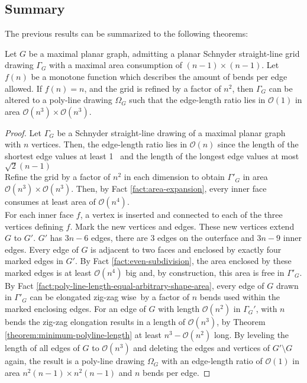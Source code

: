 \subsection{Summary}
The previous results can be summarized to the following theorems:
\begin{theorem}\label{theorem:max-planar-ratio1}
\end{theorem}
Let $G$ be a maximal planar graph, admitting a planar Schnyder straight-line grid drawing $\Gamma_G$ with a maximal area consumption of $(n-1)\times(n-1)$. Let $f(n)$ be a monotone function which describes the amount of bends per edge allowed. If $f(n) = n$, and the grid is refined by a factor of $n^2$, then $\Gamma_G$ can be altered to a poly-line drawing $\Omega_G$ such that the edge-length ratio lies in $\mathcal{O}(1)$ in area $\mathcal{O}(n^3) \times \mathcal{O}(n^3)$.
\begin{proof}
	Let $\Gamma_G$ be a Schnyder straight-line drawing of a maximal planar graph with $n$ vertices. Then, the edge-length ratio lies in $\mathcal{O}(n)$ since the length of the shortest edge values at least 1\UL~ and the length of the longest edge values at most $\sqrt{2}(n-1)$\\
	Refine the grid by a factor of $n^2$ in each dimension to obtain $\Gamma'_G$ in area $\mathcal{O}(n^3)\times \mathcal{O}(n^3)$. Then, by Fact \ref{fact:area-expansion}, every inner face consumes at least area of $\mathcal{O}(n^4)$.\\
	For each inner face $f$, a vertex is inserted and connected to each of the three vertices defining $f$. Mark the new vertices and edges. These new vertices extend $G$ to $G'$. $G'$ has $3n-6$ edges, there are 3 edges on the outerface and $3n-9$ inner edges. Every edge of $G$ is adjacent to two faces and enclosed by exactly four marked edges in $G'$. By Fact \ref{fact:even-subdivision}, the area enclosed by these marked edges is at least $\mathcal{O}(n^4)$ big and, by construction, this area is free in $\Gamma'_G$. By Fact \ref{fact:poly-line-length-equal-arbitrary-shape-area}, every edge of $G$ drawn in $\Gamma'_G$ can be elongated \grqq zig-zag wise\grqq~by a factor of $n$ bends used within the marked enclosing edges. For an edge of $G$ with length $\mathcal{O}(n^2)$ in $\Gamma_G'$, with $n$ bends the zig-zag elongation results in a length of $\mathcal{O}(n^3)$, by Theorem \ref{theorem:minimum-polyline-length} at least $n^3-\mathcal{O}(n^2)$ long. By leveling the length of all edges of $G$ to $\mathcal{O}(n^3)$ and deleting the edges and vertices of $G'\setminus G$ again, the result is a poly-line drawing $\Omega_G$ with an edge-length ratio of $\mathcal{O}(1)$ in area $n^2(n-1)\times n^2(n-1)$ and $n$ bends per edge.
\end{proof}

